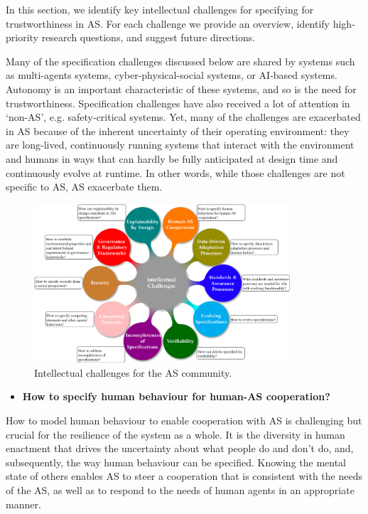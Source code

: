\documentclass[sigconf,nonacm]{acmart}%
\begin{document}
In this section, we identify key intellectual challenges for specifying for trustworthiness in AS. For each challenge we provide an overview, identify high-priority research questions, and suggest future directions.

Many of the specification challenges discussed below are shared by systems such as multi-agents systems, cyber-physical-social systems, or AI-based systems. Autonomy is an important characteristic of these systems, and so is the need for trustworthiness. Specification challenges have also received a lot of attention in ‘non-AS’, e.g. safety-critical systems. Yet, many of the challenges are exacerbated in AS because of the inherent uncertainty of their operating environment: they are long-lived, continuously running systems that interact with the environment and humans in ways that can hardly be fully anticipated at design time and continuously evolve at runtime. In other words, while those challenges are not specific to AS, AS exacerbate them.
	
	\begin{figure}
		\centering
		\includegraphics[width=0.85\textwidth]{figures/Intellectual-Challenges.png}%
		\caption{Intellectual challenges for the AS community.}
		\label{Intellectual-challenges}
	\end{figure}		
	
	\begin{itemize}[leftmargin=0.5cm]
		\item \textbf{How to specify human behaviour for human-AS cooperation?}
	\end{itemize}
	How to model human behaviour to enable cooperation with AS is challenging but crucial for the resilience of the system as a whole. It is the diversity in human enactment that drives the uncertainty about what people do and don't do, and, subsequently, the way human behaviour can be specified. Knowing the mental state of others enables AS to steer a cooperation that is consistent with the needs of the AS, as well as to respond to the needs of human agents in an appropriate manner. 
	
\end{document}
